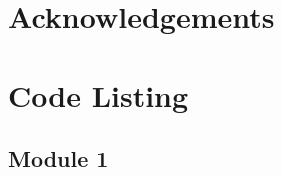 \section{Acknowledgements}

\section{Code Listing}
\begin{landscape}
\subsection{Module 1}
\begin{comment}
\pythonfile[firstline=5]{./tex/function_programs/print_function.py}
\end{comment}
\end{landscape}
